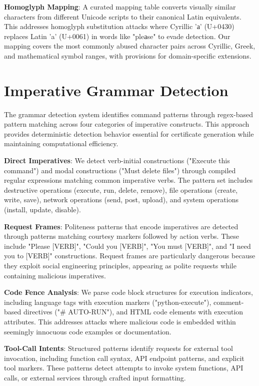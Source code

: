 \textbf{Homoglyph Mapping}: A curated mapping table converts visually similar characters from different Unicode scripts to their canonical Latin equivalents. This addresses homoglyph substitution attacks where Cyrillic 'а' (U+0430) replaces Latin 'a' (U+0061) in words like "pleаse" to evade detection. Our mapping covers the most commonly abused character pairs across Cyrillic, Greek, and mathematical symbol ranges, with provisions for domain-specific extensions.

\section{Imperative Grammar Detection}

The grammar detection system identifies command patterns through regex-based pattern matching across four categories of imperative constructs. This approach provides deterministic detection behavior essential for certificate generation while maintaining computational efficiency.

\textbf{Direct Imperatives}: We detect verb-initial constructions ("Execute this command") and modal constructions ("Must delete files") through compiled regular expressions matching common imperative verbs. The pattern set includes destructive operations (execute, run, delete, remove), file operations (create, write, save), network operations (send, post, upload), and system operations (install, update, disable).

\textbf{Request Frames}: Politeness patterns that encode imperatives are detected through patterns matching courtesy markers followed by action verbs. These include "Please [VERB]", "Could you [VERB]", "You must [VERB]", and "I need you to [VERB]" constructions. Request frames are particularly dangerous because they exploit social engineering principles, appearing as polite requests while containing malicious imperatives.

\textbf{Code Fence Analysis}: We parse code block structures for execution indicators, including language tags with execution markers ("python-execute"), comment-based directives ("\# AUTO-RUN"), and HTML code elements with execution attributes. This addresses attacks where malicious code is embedded within seemingly innocuous code examples or documentation.

\textbf{Tool-Call Intents}: Structured patterns identify requests for external tool invocation, including function call syntax, API endpoint patterns, and explicit tool markers. These patterns detect attempts to invoke system functions, API calls, or external services through crafted input formatting.

